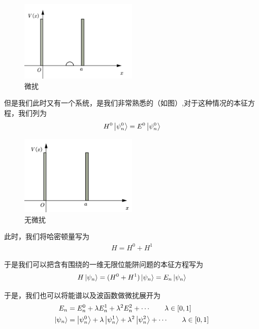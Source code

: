 \documentclass{article}
\begin{document}
\begin{figure}[hbtp]
    \centering
    \includegraphics[width=0.5\textwidth]{figure/存在微扰的一维无限位能阱.png}
    \caption{微扰}
\end{figure}



但是我们此时又有一个系统，是我们非常熟悉的（如图）,对于这种情况的本征方程，我们列为
\begin{align*}
    H^0\ket{\psi_n^0}=E^0\ket{\psi_n^0}
\end{align*}

\begin{figure}
    \centering
    \includegraphics[width=0.5\textwidth]{figure/一维无限位能阱.png}
    \caption{无微扰}
\end{figure}
此时，我们将哈密顿量写为
\begin{align*}
    H=H^0+ H^1
\end{align*}

于是我们可以把含有围绕的一维无限位能阱问题的本征方程写为
\begin{align*}
    H\ket{\psi_n}=(H^0+H^1)\ket{\psi_n}=E_n\ket{\psi_n}
\end{align*}

于是，我们也可以将能谱以及波函数做微扰展开为
\begin{align*}
    E_n&=E_n^0+\lambda E_n^1+\lambda^2 E_n^2+\cdots\quad\quad \lambda\in[0,1]\\
    \ket{\psi_n}&=\ket{\psi_n^0}+\lambda\ket{\psi_n^1}+\lambda^2\ket{\psi_n^2}+\cdots\quad\quad \lambda\in[0,1]
\end{align*}
\end{document}
